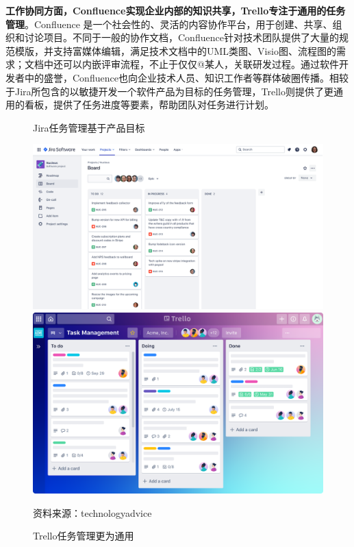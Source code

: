 \textbf{工作协同方面，Confluence实现企业内部的知识共享，Trello专注于通用的任务管理}。Confluence 是一个社会性的、灵活的内容协作平台，用于创建、共享、组织和讨论项目。不同于一般的协作文档，Confluence针对技术团队提供了大量的规范模版，并支持富媒体编辑，满足技术文档中的UML类图、Visio图、流程图的需求；文档中还可以内嵌评审流程，不止于仅仅@某人，关联研发过程。通过软件开发者中的盛誉，Confluence也向企业技术人员、知识工作者等群体破圈传播。相较于Jira所包含的以敏捷开发一个软件产品为目标的任务管理，Trello则提供了更通用的看板，提供了任务进度等要素，帮助团队对任务进行计划。
\begin{figure}[H]
    \begin{minipage}{0.48\linewidth}
        \caption{Jira任务管理基于产品目标}
        \includegraphics[width=\linewidth]{img/jira.png}
    \end{minipage}
    \begin{minipage}{0.48\linewidth}
        \caption{Trello任务管理更为通用}
        \includegraphics[width=\linewidth]{img/Trello.png}
    \end{minipage}

    \footnotesize{资料来源：technologyadvice}
\end{figure}

